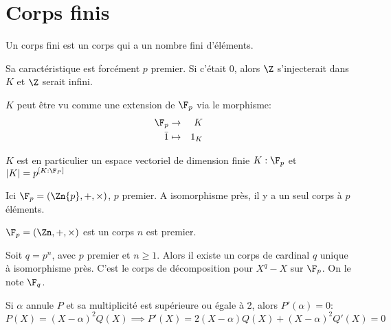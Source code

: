
\section{Corps finis}

Un corps fini est un corps qui a un nombre fini d'éléments.

Sa caractéristique est forcément $p$ premier.
Si c'était 0, alors $\Z$ s'injecterait dans $K$ et $\Z$ serait infini.

$K$ peut être vu comme une extension de $\F_p$ via le morphisme:
\begin{eqnarray*}
	\F_p & \to & K \\
	\bar{1} &\mapsto& 1_K
\end{eqnarray*}

$K$ est en particulier un espace vectoriel de dimension finie ${K:\F_p}$ et $|K| = p ^{[K:\F_P]} $


Ici $\F_p = \left( \Zn{p}, +, \times \right)$, $p$ premier.
A isomorphisme près, il y a un seul corps à $p$ éléments.

$\F_p = \left( \Zn, +, \times \right)$ est un corps \ssi $n$ est premier.


\begin{theorem}
	Soit $q = p^n$, avec $p$ premier et $n \geq 1$. Alors il existe un corps de cardinal $q$ unique à isomorphisme près.
	C'est le corps de décomposition pour $X^q-X$ sur $\F_p$. On le note $\F_q$.
\end{theorem}


\begin{rappel} 
	Si $\alpha$ annule $P$ et sa multiplicité est supérieure ou égale à 2, alors $P'(\alpha) = 0$:
	$$P(X) = (X-\alpha)^2Q(X) \implies P'(X) = 2(X-\alpha)Q(X) + (X-\alpha)^2Q'(X) = 0$$
\end{rappel}


